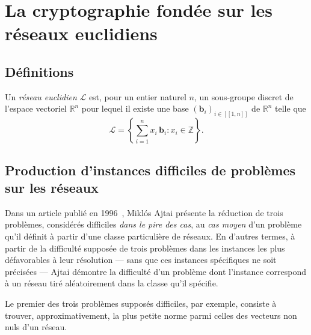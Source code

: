 
\section{La cryptographie fondée sur les réseaux euclidiens} %
\label{sec:reseaux}




\subsection{Définitions}
Un \emph{réseau euclidien} $\mathcal{L}$ est, pour un entier naturel $n$, un sous-groupe discret de l’espace vectoriel $\mathbb{R}^n$ pour lequel il existe une base $(\mathbf{b}_i)_{i\in[\![1, n]\!]}$ de $\mathbb{R}^n$ telle que
\[
\mathcal{L} =\left\{ \sum^n_{i=1} x_i\,\mathbf{b}_i : x_i \in \mathbb Z\right\}\text{.}
\]


\subsection{Production d'instances difficiles de problèmes sur les réseaux}

Dans un article publié en 1996~\cite{STOC:Ajtai96}, Miklós Ajtai présente la réduction de trois problèmes, considérés
difficiles \emph{dans le pire des cas}, au \emph{cas moyen} d’un problème qu’il définit à partir
d’une classe particulière de réseaux.
En d’autres termes, à partir de la difficulté supposée de trois problèmes dans les instances les
plus défavorables à leur résolution --- sans que ces instances spécifiques ne soit précisées ---
Ajtai démontre la difficulté d’un problème dont l’instance correspond à un réseau tiré aléatoirement
dans la classe qu’il spécifie.

Le premier des trois problèmes supposés difficiles, par exemple, consiste à trouver,
approximativement, la plus petite norme parmi celles des vecteurs non nuls d’un réseau.

